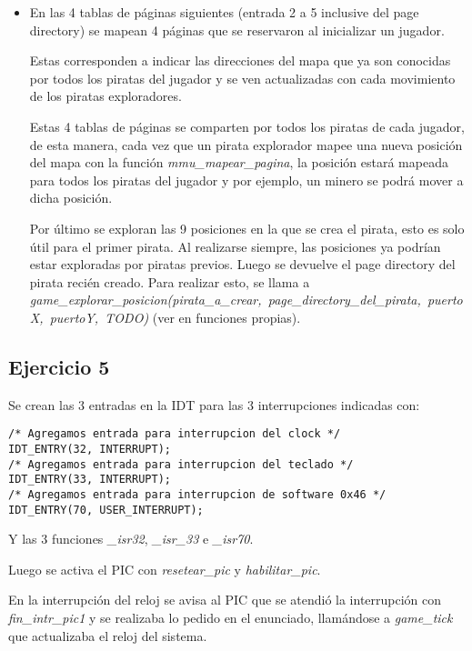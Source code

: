 \begin{itemize}
\item En las 4 tablas de páginas siguientes (entrada 2 a 5 inclusive del page
directory) se mapean 4 páginas que se reservaron al inicializar un jugador.

Estas corresponden a indicar las direcciones del mapa que ya son conocidas por
todos los piratas del jugador y se ven actualizadas con cada movimiento de los
piratas exploradores.

Estas 4 tablas de páginas se comparten por todos los piratas de cada jugador, de
esta manera, cada vez que un pirata explorador mapee una nueva posición del mapa
con la función {\it mmu_mapear_pagina\/}, la posición estará mapeada para todos
los piratas del jugador y por ejemplo, un minero se podrá mover a dicha posición.

Por último se exploran las 9 posiciones en la que se crea el pirata, esto es
solo útil para el primer pirata. Al realizarse siempre, las posiciones ya
podrían estar exploradas por piratas previos. Luego se devuelve el page
directory del pirata recién creado. Para realizar esto, se llama a
\hbox{\it game_explorar_posicion(pirata_a_crear, page_directory_del_pirata, puertoX, puertoY, TODO)}
(ver en funciones propias).
\end{itemize}

\subsection{Ejercicio 5}

Se crean las 3 entradas en la IDT para las 3 interrupciones indicadas con:
\begin{lstlisting}
/* Agregamos entrada para interrupcion del clock */
IDT_ENTRY(32, INTERRUPT);
/* Agregamos entrada para interrupcion del teclado */
IDT_ENTRY(33, INTERRUPT);
/* Agregamos entrada para interrupcion de software 0x46 */
IDT_ENTRY(70, USER_INTERRUPT);
\end{lstlisting}

Y las 3 funciones {\it _isr32\/}, {\it _isr_33\/} e {\it _isr70\/}.

Luego se activa el PIC con {\it resetear_pic\/} y {\it habilitar_pic\/}.

En la interrupción del reloj se avisa al PIC que se atendió la interrupción con
{\it fin_intr_pic1} y se realizaba lo pedido en el enunciado, llamándose a
{\it game_tick\/} que actualizaba el reloj del sistema.


